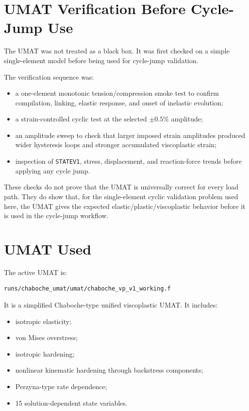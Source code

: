 \documentclass[11pt,a4paper]{article}
\begin{document}
\section{UMAT Verification Before Cycle-Jump Use}

The UMAT was not treated as a black box. It was first checked on a simple single-element model before being used for cycle-jump validation.

The verification sequence was:

\begin{itemize}
  \item a one-element monotonic tension/compression smoke test to confirm compilation, linking, elastic response, and onset of inelastic evolution;
  \item a strain-controlled cyclic test at the selected $\pm0.5\%$ amplitude;
  \item an amplitude sweep to check that larger imposed strain amplitudes produced wider hysteresis loops and stronger accumulated viscoplastic strain;
  \item inspection of \texttt{STATEV1}, stress, displacement, and reaction-force trends before applying any cycle jump.
\end{itemize}

These checks do not prove that the UMAT is universally correct for every load path. They do show that, for the single-element cyclic validation problem used here, the UMAT gives the expected elastic/plastic/viscoplastic behavior before it is used in the cycle-jump workflow.

\section{UMAT Used}

The active UMAT is:

\begin{verbatim}
runs/chaboche_umat/umat/chaboche_vp_v1_working.f
\end{verbatim}

It is a simplified Chaboche-type unified viscoplastic UMAT. It includes:

\begin{itemize}
  \item isotropic elasticity;
  \item von Mises overstress;
  \item isotropic hardening;
  \item nonlinear kinematic hardening through backstress components;
  \item Perzyna-type rate dependence;
  \item 15 solution-dependent state variables.
\end{itemize}
\end{document}
